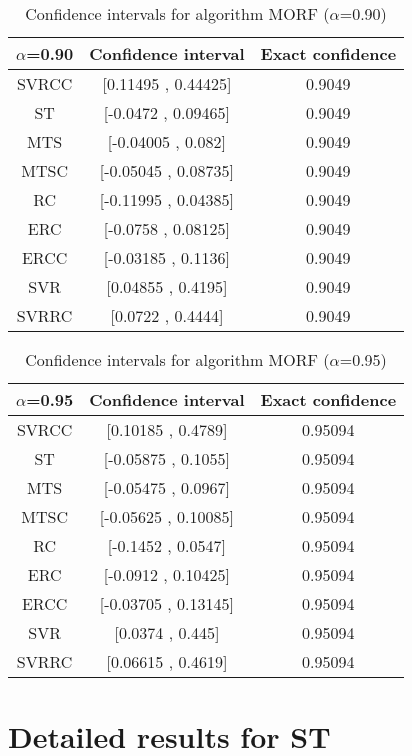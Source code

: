 \documentclass[a4paper,10pt]{article}
\begin{document}
\begin{table}[!htp]
\centering\small
\begin{tabular}{
|c|c|c|}
\hline
 $\alpha$=0.90 & Confidence interval & Exact confidence \\ \hline 
SVRCC & [0.11495 , 0.44425] & 0.9049\\ \hline 
ST & [-0.0472 , 0.09465] & 0.9049\\ \hline 
MTS & [-0.04005 , 0.082] & 0.9049\\ \hline 
MTSC & [-0.05045 , 0.08735] & 0.9049\\ \hline 
RC & [-0.11995 , 0.04385] & 0.9049\\ \hline 
ERC & [-0.0758 , 0.08125] & 0.9049\\ \hline 
ERCC & [-0.03185 , 0.1136] & 0.9049\\ \hline 
SVR & [0.04855 , 0.4195] & 0.9049\\ \hline 
SVRRC & [0.0722 , 0.4444] & 0.9049\\ \hline 

\end{tabular}
\caption{Confidence intervals for algorithm MORF ($\alpha$=0.90)}
\end{table}
\begin{table}[!htp]
\centering\small
\begin{tabular}{
|c|c|c|}
\hline
 $\alpha$=0.95 & Confidence interval & Exact confidence \\ \hline 
SVRCC & [0.10185 , 0.4789] & 0.95094\\ \hline 
ST & [-0.05875 , 0.1055] & 0.95094\\ \hline 
MTS & [-0.05475 , 0.0967] & 0.95094\\ \hline 
MTSC & [-0.05625 , 0.10085] & 0.95094\\ \hline 
RC & [-0.1452 , 0.0547] & 0.95094\\ \hline 
ERC & [-0.0912 , 0.10425] & 0.95094\\ \hline 
ERCC & [-0.03705 , 0.13145] & 0.95094\\ \hline 
SVR & [0.0374 , 0.445] & 0.95094\\ \hline 
SVRRC & [0.06615 , 0.4619] & 0.95094\\ \hline 

\end{tabular}
\caption{Confidence intervals for algorithm MORF ($\alpha$=0.95)}
\end{table}

 \clearpage 


\section{Detailed results for ST}
\end{document}
